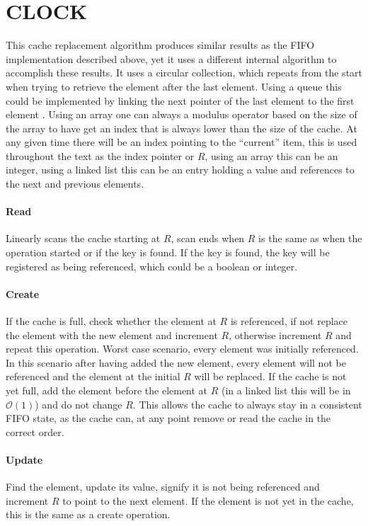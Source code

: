 \documentclass[pdftex,a4paper,12pt,twoside]{report}
\begin{document}
\section{CLOCK}
This cache replacement algorithm produces similar results as the FIFO implementation described above, yet it uses a different internal algorithm to accomplish these results. It uses a circular collection, which repeats from the start when trying to retrieve the element after the last element. Using a queue this could be implemented by linking the next pointer of the last element to the first element \citep{clock_cpan}. Using an array one can always a modulus operator based on the size of the array to have get an index that is always lower than the size of the cache. At any given time there will be an index pointing to the ``current'' item, this is used throughout the text as the index pointer or $R$, using an array this can be an integer, using a linked list this can be an entry holding a value and references to the next and previous elements.
\paragraph{Read} Linearly scans the cache starting at $R$, scan ends when $R$ is the same as when the operation started or if the key is found. If the key is found, the key will be registered as being referenced, which could be a boolean or integer.
\paragraph{Create} If the cache is full, check whether the element at $R$ is referenced, if not replace the element with the new element and increment $R$, otherwise increment $R$ and repeat this operation. Worst case scenario, every element was initially referenced. In this scenario after having added the new element, every element will not be referenced and the element at the initial $R$ will be replaced. If the cache is not yet full, add the element before the element at $R$ (in a linked list this will be in $\mathcal{O}(1)$) and do not change $R$. This allows the cache to always stay in a consistent FIFO state, as the cache can, at any point remove or read the cache in the correct order.
\paragraph{Update} Find the element, update its value, signify it is not being referenced and increment $R$ to point to the next element. If the element is not yet in the cache, this is the same as a create operation.
\end{document}
